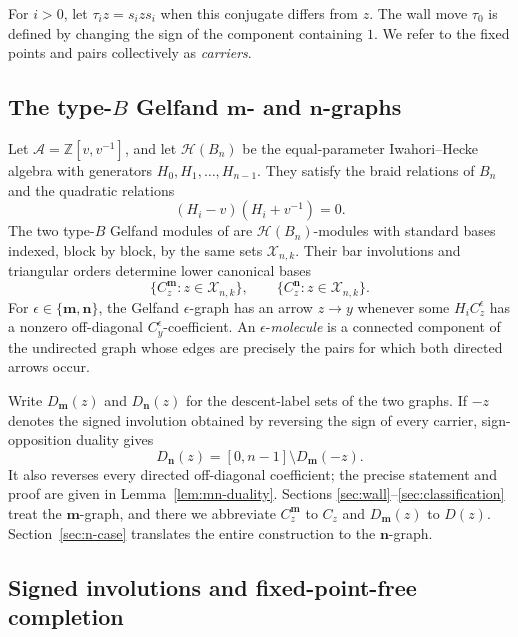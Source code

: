 \documentclass[11pt]{article}
\theoremstyle{definition}
\theoremstyle{remark}
\newcommand{\cA}{\mathcal A}
\newcommand{\cX}{\mathcal X}
\newcommand{\mgraph}{\mathbf m}
\newcommand{\ngraph}{\mathbf n}
\begin{document}
For $i>0$, let $\tau_i z=s_i z s_i$ when this conjugate differs from $z$.
The wall move $\tau_0$ is defined by changing the sign of the component
containing $1$.  We refer to the fixed points and pairs collectively as
\emph{carriers}.

\subsection{The type-\texorpdfstring{$B$}{B} Gelfand
\texorpdfstring{$\mgraph$}{m}- and \texorpdfstring{$\ngraph$}{n}-graphs}

Let $\cA=\mathbb Z[v,v^{-1}]$, and let $\mathcal H(B_n)$ be the
equal-parameter Iwahori--Hecke algebra with generators
$H_0,H_1,\ldots,H_{n-1}$.  They satisfy the braid relations of $B_n$ and
the quadratic relations
\[
                      (H_i-v)(H_i+v^{-1})=0.
\]
The two type-$B$ Gelfand modules of \cite{MZGelfand} are
$\mathcal H(B_n)$-modules with standard bases indexed, block by block, by
the same sets $\cX_{n,k}$.  Their bar involutions and triangular orders
determine lower canonical bases
\[
 \{C_z^{\mgraph}:z\in\cX_{n,k}\},
 \qquad
 \{C_z^{\ngraph}:z\in\cX_{n,k}\}.
\]
For $\epsilon\in\{\mgraph,\ngraph\}$, the Gelfand
$\epsilon$-graph has an arrow $z\to y$ whenever some $H_iC_z^\epsilon$
has a nonzero off-diagonal $C_y^\epsilon$-coefficient.  An
$\epsilon$-\emph{molecule} is a connected component of the undirected
graph whose edges are precisely the pairs for which both directed arrows
occur.

Write $D_{\mgraph}(z)$ and $D_{\ngraph}(z)$ for the descent-label sets of
the two graphs.  If $-z$ denotes the signed involution obtained by
reversing the sign of every carrier, sign-opposition duality gives
\begin{equation}
 D_{\ngraph}(z)=[0,n-1]\setminus D_{\mgraph}(-z).
 \label{eq:mn-label-duality}
\end{equation}
It also reverses every directed off-diagonal coefficient; the precise
statement and proof are given in Lemma~\ref{lem:mn-duality}.  Sections
\ref{sec:wall}--\ref{sec:classification} treat the $\mgraph$-graph, and
there we abbreviate $C_z^{\mgraph}$ to $C_z$ and
$D_{\mgraph}(z)$ to $D(z)$.  Section~\ref{sec:n-case} translates the
entire construction to the $\ngraph$-graph.

\subsection{Signed involutions and fixed-point-free completion}
\end{document}
